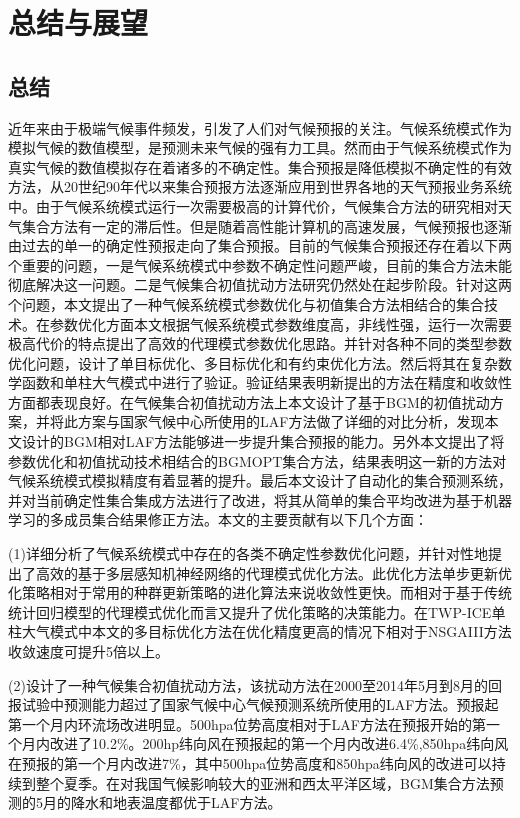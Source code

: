 \chapter{总结与展望}
\label{cha:intro}

\section{总结}
近年来由于极端气候事件频发，引发了人们对气候预报的关注。气候系统模式作为模拟气候的数值模型，是预测未来气候的强有力工具。然而由于气候系统模式作为真实气候的数值模拟存在着诸多的不确定性。集合预报是降低模拟不确定性的有效方法，从20世纪90年代以来集合预报方法逐渐应用到世界各地的天气预报业务系统中。由于气候系统模式运行一次需要极高的计算代价，气候集合方法的研究相对天气集合方法有一定的滞后性。但是随着高性能计算机的高速发展，气候预报也逐渐由过去的单一的确定性预报走向了集合预报。目前的气候集合预报还存在着以下两个重要的问题，一是气候系统模式中参数不确定性问题严峻，目前的集合方法未能彻底解决这一问题。二是气候集合初值扰动方法研究仍然处在起步阶段。针对这两个问题，本文提出了一种气候系统模式参数优化与初值集合方法相结合的集合技术。在参数优化方面本文根据气候系统模式参数维度高，非线性强，运行一次需要极高代价的特点提出了高效的代理模式参数优化思路。并针对各种不同的类型参数优化问题，设计了单目标优化、多目标优化和有约束优化方法。然后将其在复杂数学函数和单柱大气模式中进行了验证。验证结果表明新提出的方法在精度和收敛性方面都表现良好。在气候集合初值扰动方法上本文设计了基于BGM的初值扰动方案，并将此方案与国家气候中心所使用的LAF方法做了详细的对比分析，发现本文设计的BGM相对LAF方法能够进一步提升集合预报的能力。另外本文提出了将参数优化和初值扰动技术相结合的BGMOPT集合方法，结果表明这一新的方法对气候系统模式模拟精度有着显著的提升。最后本文设计了自动化的集合预测系统，并对当前确定性集合集成方法进行了改进，将其从简单的集合平均改进为基于机器学习的多成员集合结果修正方法。本文的主要贡献有以下几个方面：

(1)详细分析了气候系统模式中存在的各类不确定性参数优化问题，并针对性地提出了高效的基于多层感知机神经网络的代理模式优化方法。此优化方法单步更新优化策略相对于常用的种群更新策略的进化算法来说收敛性更快。而相对于基于传统统计回归模型的代理模式优化而言又提升了优化策略的决策能力。在TWP-ICE单柱大气模式中本文的多目标优化方法在优化精度更高的情况下相对于NSGAIII方法收敛速度可提升5倍以上。

(2)设计了一种气候集合初值扰动方法，该扰动方法在2000至2014年5月到8月的回报试验中预测能力超过了国家气候中心气候预测系统所使用的LAF方法。预报起第一个月内环流场改进明显。500hpa位势高度相对于LAF方法在预报开始的第一个月内改进了10.2\%。200hp纬向风在预报起的第一个月内改进6.4\%,850hpa纬向风在预报的第一个月内改进7\%，其中500hpa位势高度和850hpa纬向风的改进可以持续到整个夏季。在对我国气候影响较大的亚洲和西太平洋区域，BGM集合方法预测的5月的降水和地表温度都优于LAF方法。

